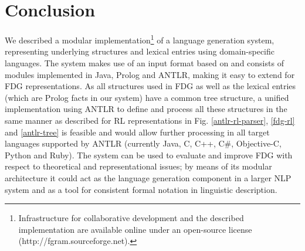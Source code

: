 \documentclass[a4paper, halfparskip, onecolumn, abstractoff, final]{scrartcl}
\newcommand{\noun}[1]{\textsc{#1}}
\begin{document}

\section{Conclusion}
\normalsize
We described a modular implementation\footnote{Infrastructure for collaborative development and the described implementation are available online under an open-source license (http://fgram.sourceforge.net).} of a language generation system, representing underlying structures and lexical entries using domain-specific languages. The system makes use of an input format based on \cite{Dik1997a} and consists of modules implemented in Java, Prolog and ANTLR, making it easy to extend for FDG representations. As all structures used in FDG as well as the lexical entries (which are Prolog facts in our system) have a common tree structure, a unified implementation using ANTLR to define and process all these structures in the same manner as described for RL representations in  Fig.  \ref{antlr-rl-parser}, \ref{fdg-rl} and \ref{antlr-tree} is feasible and would allow further processing in all target languages supported by ANTLR (currently Java, C, C++, C\#, Objective-C, Python and Ruby). The system can be used to evaluate and improve FDG with respect to theoretical and representational issues; by means of its modular architecture it could act as the language generation component in a larger NLP system and as a tool for consistent formal notation in linguistic description.

\newpage




\end{document}
